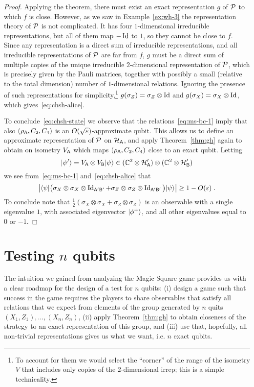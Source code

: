 \begin{proof}
Applying the theorem, there must exist an exact representation $g$ of $\mathcal{P}$ to which $f$ is close. However, as we saw in Example~\ref{ex:wh-3} the representation theory of $\mathcal{P}$ is not complicated. It has four $1$-dimensional irreducible representations, but all of them map $-\mathop{\rm Id}\nolimits$ to $1$, so they cannot be close to $f$. Since any representation is a direct sum of irreducible representations, and all irreducible representations of $\mathcal{P}$ are far from $f$, $g$ must be a direct sum of multiple copies of the unique irreducible $2$-dimensional representation of $\mathcal{P}$, which is precisely given by the Pauli matrices, together with possibly a small (relative to the total dimension) number of $1$-dimensional relations. Ignoring the presence of such representations for simplicity,\footnote{To account for them we would select the ``corner'' of the range of the isometry $V$ that includes only copies of the $2$-dimensional irrep; this is a simple technicality.} $g(\sigma_Z) = \sigma_Z \otimes \mathop{\rm Id}\nolimits$ and $g(\sigma_X) = \sigma_X \otimes \mathop{\rm Id}\nolimits$, which gives~\eqref{eq:chsh-alice}. 

To conclude~\eqref{eq:chsh-state} we observe that the relations~\eqref{eq:ms-bc-1} imply that also $(\rho_{\textsf{A}},C_2,C_4)$ is an $O(\sqrt{\varepsilon})$-approximate qubit. This allows us to define an approximate representation of $\mathcal{P}$ on $\mathcal{H}_{\textsf{A}}$, and apply Theorem~\ref{thm:gh} again to obtain on isometry $V_{\textsf{A}}$ which maps $(\rho_{\textsf{A}},C_2,C_4)$ close to an exact qubit. Letting 
\[ |\psi'\rangle = V_{\textsf{A}} \otimes V_{\textsf{B}} |\psi\rangle \in (\mathbb{C}^2 \otimes \mathcal{H}_{\textsf{A}}')\otimes (\mathbb{C}^2 \otimes \mathcal{H}_{\textsf{B}}') \]
we see from~\eqref{eq:ms-bc-1} and~\eqref{eq:chsh-alice} that 
\[\big| \langle\psi| \big(\sigma_X \otimes \sigma_X \otimes \mathop{\rm Id}\nolimits_{{\textsf{A}}'{\textsf{B}}'} + \sigma_Z \otimes \sigma_Z \otimes \mathop{\rm Id}\nolimits_{{\textsf{A}}'{\textsf{B}}'} \big) |\psi\rangle\big| \geq 1-O({\varepsilon})\;.\]
To conclude note that $\frac{1}{2}(\sigma_X \otimes \sigma_X + \sigma_Z \otimes \sigma_Z )$ is an observable with a single eigenvalue $1$, with associated eigenvector $|\phi^+\rangle$, and all other eigenvalues equal to $0$ or $-1$. 
\end{proof}



\section{Testing $n$ qubits}
\label{sec:nqubit-test}

The intuition we gained from analyzing the Magic Square game provides us with a clear roadmap for the design of a test for $n$ qubits: (i) design a game such that success in the game requires the players to share observables that satisfy all relations that we expect from elements of the group generated by $n$ quits $(X_1,Z_1),\ldots,(X_n,Z_n)$, (ii) apply Theorem~\ref{thm:gh} to obtain closeness of the strategy to an exact representation of this group, and (iii) use that, hopefully, all non-trivial representations gives us what we want, i.e. $n$ exact qubits. 

